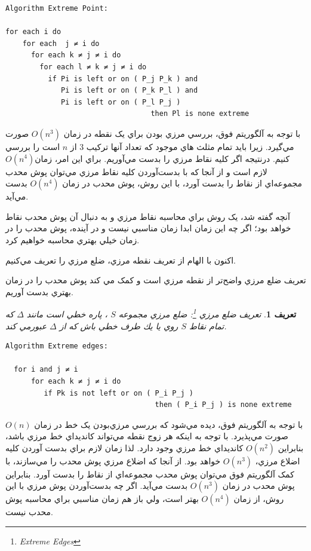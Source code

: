 \documentclass{book}
\newtheorem{defn}[section]{تعریف}
\begin{document}
\begin{latin}
\begin{verbatim}
Algorithm Extreme Point:

for each i do
    for each  j ≠ i do
      for each k ≠ j ≠ i do
        for each l ≠ k ≠ j ≠ i do
          if Pi is left or on ( P_j P_k ) and
             Pi is left or on ( P_k P_l ) and
             Pi is left or on ( P_l P_j )
                                  then Pl is none extreme
\end{verbatim}
\end{latin}

با توجه به آلگوريتم فوق، بررسي مرزي ‌بودن براي يک نقطه در زمان $O(n^3)$ صورت مي‌گيرد. زيرا بايد تمام مثلث هاي موجود که تعداد آنها ترکيب 3 از $n$ است را بررسي کنيم. در‌نتيجه اگر کليه نقاط مرزي را بدست مي‌آوريم. براي اين امر، زمان$ O(n^4)$ لازم است و از آنجا که با بدست‌آوردن کليه نقاط مرزي مي‌توان پوش محدب مجموعه‌اي از نقاط را بدست آورد، با اين روش، پوش محدب در زمان $O(n^4)$ بدست مي‌آيد.

آنچه گفته شد، يک روش براي محاسبه نقاط مرزي و به دنبال آن پوش محدب نقاط خواهد بود؛ اگر چه اين زمان ابدا زمان مناسبي نيست و در آينده، پوش محدب را در زمان خيلي بهتري محاسبه خواهيم کرد.

اکنون با الهام از تعريف نقطه مرزي، ضلع مرزي را تعريف مي‌کنيم.

تعريف ضلع مرزي واضح‌تر از نقطه مرزي است و کمک مي کند پوش محدب را در زمان بهتري بدست آوريم. 

\begin{defn}
    تعريف ضلع مرزي \footnote{Extreme Edges}:
    ضلع مرزي مجموعه $S$ ، پاره خطي است مانند $\Delta$ كه تمام نقاط $S$ روي يا يك طرف خطي باش که از $\Delta$  عبورمي کند. 
\end{defn}

\begin{latin}
\begin{verbatim}
Algorithm Extreme edges:

  for i and j ≠ i 
      for each k ≠ j ≠ i do
         if Pk is not left or on ( P_i P_j )
                                   then ( P_i P_j ) is none extreme 
\end{verbatim}
\end{latin}

با توجه به آلگوريتم فوق، ديده مي‌شود که بررسي مرزي‌بودن يک خط در زمان $O(n)$ صورت مي‌پذيرد. با توجه به اينکه هر زوج نقطه‌ مي‌تواند کانديداي خط مرزي باشد، بنابراين $O(n^2)$ کانديداي خط مرزي وجود دارد. لذا زمان لازم براي بدست آوردن کليه اضلاع مرزي، $O(n^3)$ خواهد بود. از آنجا که اضلاع مرزي پوش محدب را مي‌سازند، با کمک آلگوريتم فوق مي‌توان پوش محدب مجموعه‌اي از نقاط را بدست آورد. بنابراين پوش محدب در زمان  $O(n^3)$ بدست مي‌آيد. اگر چه بدست‌آوردن پوش مرزي با اين روش، از زمان $O(n^4)$ بهتر است، ولي باز هم زمان مناسبي براي محاسبه پوش محدب نيست.
\end{document}
